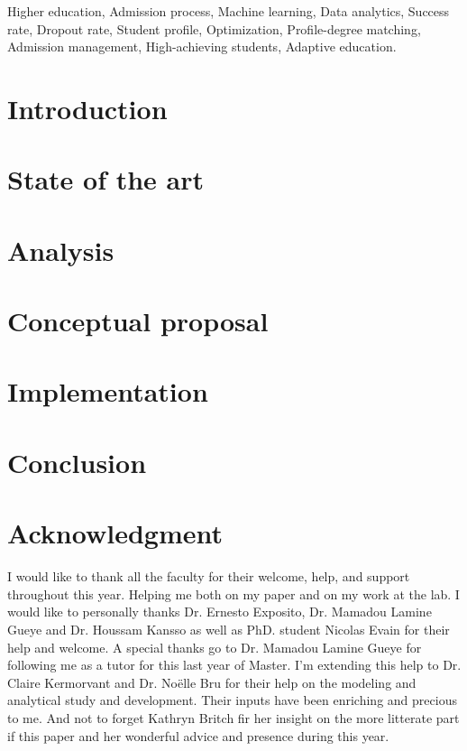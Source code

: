 \documentclass[conference]{IEEEtran}
\begin{document}
\begin{IEEEkeywords}
Higher education, Admission process, Machine learning, Data analytics, Success rate, Dropout rate, Student profile, Optimization, Profile-degree matching, Admission management, High-achieving students, Adaptive education.

\end{IEEEkeywords}
\vspace{16pt}

\section{Introduction}
\label{sec:introduction}  


\section{State of the art}
\label{sec:soa}


\section{Analysis}
\label{sec:analysis}


\section{Conceptual proposal}
\label{sec:conprop}


\section{Implementation}
\label{sec:imp}


\section{Conclusion}
\label{sec:conclusion}


\vspace{16pt}
\section{Acknowledgment}
\label{sec:aknow}
I would like to thank all the faculty for their welcome, help, and support throughout this year. Helping me both on my paper and on my work at the lab. I would like to personally thanks Dr. Ernesto Exposito, Dr. Mamadou Lamine Gueye and Dr. Houssam Kansso as well as PhD. student Nicolas Evain for their help and welcome. A special thanks go to Dr. Mamadou Lamine Gueye for following me as a tutor for this last year of Master.
I'm extending this help to Dr. Claire Kermorvant and Dr. Noëlle Bru for their help on the modeling and analytical study and development. Their inputs have been enriching and precious to me.
And not to forget Kathryn Britch fir her insight on the more litterate part if this paper and her wonderful advice and presence during this year.
\end{document}
